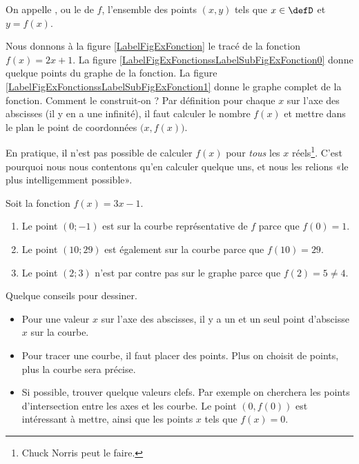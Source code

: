 \begin{definition}
    On appelle , ou le  de $f$, l'ensemble des points $(x,y)$ tels que $x\in\defD$ et $y=f(x)$.
\end{definition}

\newcommand{\CaptionFigExFonction}{Comment tracer la fonction \( f(x)=2x+1\) ?}


Nous donnons à la figure \ref{LabelFigExFonction} le tracé de la fonction \( f(x)=2x+1\). La figure \ref{LabelFigExFonctionssLabelSubFigExFonction0} donne quelque points du graphe de la fonction. La figure \ref{LabelFigExFonctionssLabelSubFigExFonction1} donne le graphe complet de la fonction. Comment le construit-on ? Par définition pour chaque \( x\) sur l'axe des abscisses (il y en a une infinité), il faut calculer le nombre \( f(x)\) et mettre dans le plan le point de coordonnées \( \big( x,f(x) \big)\).

En pratique, il n'est pas possible de calculer \( f(x)\) pour \emph{tous} les \( x\) réels\footnote{Chuck Norris peut le faire.}. C'est pourquoi nous nous contentons qu'en calculer quelque uns, et nous les relions «le plus intelligemment possible».

\begin{example}
    Soit la fonction \( f(x)=3x-1\).
    \begin{enumerate}
        \item
            Le point \( (0;-1)\) est sur la courbe représentative de \( f\) parce que \( f(0)=1\).
        \item
            Le point \( (10;29)\) est également sur la courbe parce que \( f(10)=29\).
        \item
            Le point \( (2;3)\) n'est par contre pas sur le graphe parce que \( f(2)=5\neq 4\).
    \end{enumerate}
\end{example}

Quelque conseils pour dessiner.
\begin{itemize}
    \item
        Pour une valeur $x$ sur l'axe des abscisses, il y a un et un seul point d'abscisse $x$ sur la courbe.
    \item
        Pour tracer une courbe, il faut placer des points. Plus on choisit de points, plus la courbe sera précise.
    \item
        Si possible, trouver quelque valeurs clefs. Par exemple on cherchera les points d'intersection entre les axes et les courbe. Le point \( (0,f(0)) \) est intéressant à mettre, ainsi que les points \( x\) tels que \( f(x)=0\).
\end{itemize}

